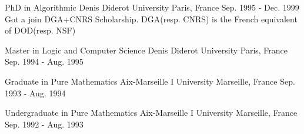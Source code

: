 

\begin{cventries}

  \cventry
    {PhD in Algorithmic} %
    {Denis Diderot University} %
    {Paris, France} %
    {Sep. 1995 - Dec. 1999} %
    {Got a join DGA+CNRS Scholarship. DGA(resp. CNRS) is the French equivalent of DOD(resp. NSF)}
    {}

  \cventrysimple
    {Master in Logic and Computer Science} %
    {Denis Diderot University} %
    {Paris, France} %
    {Sep. 1994 - Aug. 1995} %

  \cventrysimple
    {Graduate in Pure Mathematics} %
    {Aix-Marseille I University} %
    {Marseille, France} %
    {Sep. 1993 - Aug. 1994} %

  \cventrysimple
    {Undergraduate in Pure Mathematics} %
    {Aix-Marseille I University} %
    {Marseille, France} %
    {Sep. 1992 - Aug. 1993} %

\end{cventries}
